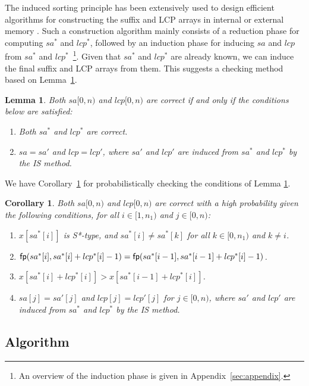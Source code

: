 \documentclass[10pt,journal,compsoc]{IEEEtran}
\newtheorem{Lemma}{Lemma}
\newtheorem{Corollary}{Corollary}
\begin{document}
The induced sorting principle has been extensively used to design efficient algorithms for constructing the suffix and LCP arrays in internal or external memory \cite{Nong11,Nong14, Nong15, Bingmann12,Fischer11}. Such a construction algorithm mainly consists of a reduction phase for computing $sa^*$ and $lcp^*$, followed by an induction phase for inducing $sa$ and $lcp$ from $sa^*$ and $lcp^*$~\footnote{An overview of the induction phase is given in Appendix~\ref{sec:appendix}.}. Given that $sa^*$ and $lcp^*$ are already known, we can induce the final suffix and LCP arrays from them. This suggests a checking method based on Lemma~\ref{lemma:2}. 
	
\begin{Lemma} \label{lemma:2}
Both $sa[0, n)$ and $lcp[0, n)$ are correct if and only if the conditions below are satisfied:

\begin{enumerate}[(1)]
	\item
	Both $sa^*$ and $lcp^*$ are correct.
	\item
	$sa = sa'$ and $lcp = lcp'$, where $sa'$ and $lcp'$ are induced from $sa^*$ and $lcp^*$ by the IS method.
\end{enumerate}
\end{Lemma}

We have Corollary~\ref{corollary:2} for probabilistically checking the conditions of Lemma \ref{lemma:2}.

\begin{Corollary} \label{corollary:2}
Both $sa[0, n)$ and $lcp[0, n)$ are correct with a high probability given the following conditions, for all $i \in [1, n_1)$ and $j \in [0, n)$:
\begin{enumerate}[(1)]
	\item
	$x[sa^*[i]]$ is S*-type, and $sa^*[i] \ne sa^*[k]$ for all $k \in [0, n_1)$ and $k \ne i$.
	\item
	${\sf fp}(sa^*[i], sa^*[i] + lcp^*[i] - 1) = {\sf fp}(sa^*[i - 1], sa^*[i - 1] + lcp^*[i] - 1)$.
	\item
	$x[sa^*[i] + lcp^*[i]] > x[sa^*[i - 1] + lcp^*[i]]$.
	\item
	$sa[j] = sa'[j]$ and $lcp[j] = lcp'[j]$ for $j \in [0, n)$, where $sa'$ and $lcp'$ are induced from $sa^*$ and $lcp^*$ by the IS method.
\end{enumerate}
\end{Corollary}



\subsection{Algorithm} \label{sec:method2:algorithm}
\end{document}
